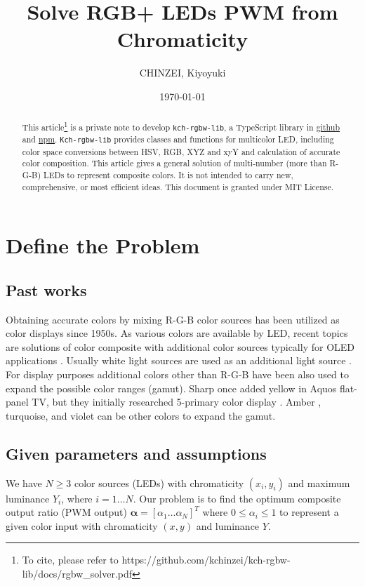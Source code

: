 \documentclass[dvipdfmx,uplatex,a4paper]{article}
\title{Solve RGB+ LEDs PWM from Chromaticity}
\author{CHINZEI, Kiyoyuki}
\date{\today}
\begin{document}
\maketitle

\begin{abstract}
This article\footnote{To cite, please refer to https://github.com/kchinzei/kch-rgbw-lib/docs/rgbw\_solver.pdf} is a private note to develop \texttt{kch-rgbw-lib}, a TypeScript library in \href{https://github.com/kchinzei/kch-rgbw-lib}{github} and \href{https://www.npmjs.com/package/kch-rgbw-lib}{npm}. \texttt{Kch-rgbw-lib} provides classes and functions for multicolor LED, including color space conversions between HSV, RGB, XYZ and xyY and calculation of accurate color composition. This article gives a general solution of multi-number (more than R-G-B) LEDs to represent composite colors. It is not intended to carry new, comprehensive, or most efficient ideas. This document is granted under MIT License.
\end{abstract}

\section{Define the Problem}
\subsection{Past works}\label{s_intro}
Obtaining accurate colors by mixing R-G-B color sources has been utilized as color displays since 1950s. As various colors are available by LED, recent topics are solutions of color composite with additional color sources typically for OLED applications \cite{Chi2011, Lee2014}. Usually white light sources are used as an additional light source \cite{AN1562, Chi2011, Lee2014}. For display purposes additional colors other than R-G-B have been also used to expand the possible color ranges (gamut)\cite{Wikipedia_multicolor}. Sharp once added yellow in Aquos flat-panel TV, but they initially researched 5-primary color display \cite{Sharp2011}. Amber \cite{AN2026}, turquoise, and violet can be other colors to expand the gamut.

\subsection{Given parameters and assumptions}\label{s_assumptions}
We have $N \geq 3$ color sources (LEDs) with chromaticity $(x_i, y_i)$ and maximum luminance $Y_i$, where $i=1 \ldots N$. Our problem is to find the optimum composite output ratio (PWM output) $\boldsymbol{\alpha} = [\alpha_1 \ldots \alpha_N]^T$ where $0 \leq \alpha_i \leq 1$ to represent a given color input with chromaticity $(x, y)$ and luminance $Y$.
\end{document}
